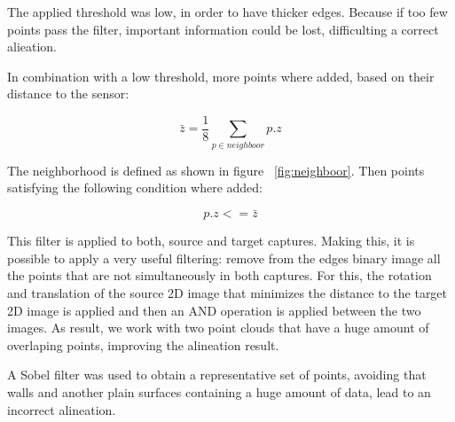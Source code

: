 The applied threshold was low, in order to have thicker edges. Because if too few points pass the filter, important information 
could be lost, difficulting a correct alieation. 


In combination with a low threshold, more points where added, based on their 
distance to the sensor:

\begin{equation}
\bar{z} = \frac{1}{8} \sum \limits_{p \in neighboor} p.z
\end{equation}

The neighborhood is defined as shown in figure ~\ref{fig:neighboor}. Then points satisfying the following condition where added:

\begin{equation}
p.z <= \bar{z}
\end{equation}

This filter is applied to both, source and target captures. Making this, it is possible to apply a very useful filtering: remove 
from the edges binary image all the points that are not simultaneously in both captures. For this, the rotation and translation 
of the source 2D image that minimizes the distance to the target 2D image is applied and then an AND operation is applied between 
the two images. As result, we work with two point clouds that have a huge amount of overlaping points, improving the alineation 
result.


A Sobel filter was used to obtain a representative set of points, avoiding that walls and another 
plain surfaces containing a huge amount of data, lead to an incorrect alineation.

